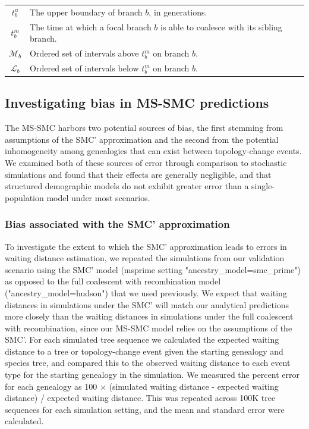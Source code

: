 \documentclass[11pt]{article}
\begin{document}
\begin{table}[p]
\begin{tabular}[t]{ |c|l| }
	$t_b^u$        & The upper boundary of branch $b$, in generations. \\
	$t_b^m$        & The time at which a focal branch $b$ is able to coalesce with its sibling branch. \\
	$\mathcal{M}_b$  & Ordered set of intervals above $t_b^m$ on branch $b$.\\
	$\mathcal{L}_b$  & Ordered set of intervals below $t_b^m$ on branch $b$.\\	
	\bottomrule
\end{tabular}
\end{table}



\newpage


\subsection{Investigating bias in MS-SMC predictions}
The MS-SMC harbors two potential sources of bias, the first stemming from 
assumptions of the SMC' approximation and the second from the 
potential inhomogeneity among genealogies that can exist 
between topology-change events.
% 
We examined both of these sources of error through comparison to stochastic
simulations and found that their effects are generally negligible,
and that structured demographic models do not exhibit 
greater error than a single-population model under most scenarios.


\subsubsection{Bias associated with the SMC' approximation}
To investigate 
the extent to which the SMC' approximation leads to errors in waiting
distance estimation, 
we repeated the simulations from our validation scenario using the SMC'
model (msprime setting "ancestry\_model=smc\_prime") as opposed to the 
full coalescent with recombination model ("ancestry\_model=hudson") that
we used previously.
% 
We expect that waiting distances in simulations under the SMC' will match 
our analytical predictions more closely than the waiting distances in 
simulations under the full coalescent with recombination, since our MS-SMC
model relies on the assumptions of the SMC'.
For each simulated tree sequence we calculated the expected waiting distance to 
a tree or topology-change event given the starting genealogy and species tree, 
and compared this to the observed waiting distance to each event type for the
starting genealogy in the simulation.
% 
We measured the percent error for each genealogy
as 100 $\times$ (simulated waiting distance - expected waiting distance) / expected waiting distance.
This was repeated across 100K tree sequences for each simulation setting, 
and the mean and standard error were calculated.
\end{document}
